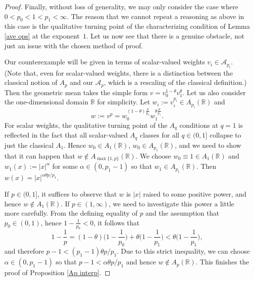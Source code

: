 \documentclass[11pt, reqno]{amsart}
\theoremstyle{definition}
\theoremstyle{remark}
\numberwithin{equation}{section}
\newcommand{\A}{\mathscr A}
\newcommand{\R}{\mathbb R}
\newcommand{\abs}[1]{|#1|}
\begin{document}
\begin{proof}
Finally, without loss of generality,
we may only consider the case where $0<p_0<1<p_1<\infty$.
The reason that we cannot repeat a reasoning as above in this case
is the qualitative turning point of the characterizing condition of
Lemma \ref{ave ops} at the exponent~$1$. Let us now see that
there is a genuine obstacle, not just an issue with the chosen method of proof.

Our counterexample will be given in terms of scalar-valued weights $v_i\in \A_{p_i}$.
(Note that, even for scalar-valued weights, there is a distinction between the classical notion of $A_p$ and our $\A_p$, which is a rescaling of the classical definition.) Then the geometric mean takes the simple form $v=v_0^{1-\theta}v_1^\theta$.
Let us also consider the one-dimensional domain $\R$ for simplicity. Let $w_i:=v_i^{p_i}\in A_{p_i}(\R)$ and
\begin{equation*}
w:=v^p=w_0^{(1-\theta)\frac{p}{p_0}}w_1^{\theta\frac{p}{p_1}}.
\end{equation*}
For scalar weights, the qualitative turning point of the $A_q$ conditions
at $q=1$ is reflected in the fact that all scalar-valued $A_q$ classes
for all $q\in(0,1]$ collapse to just the classical $A_1$.
Hence $w_0\in A_1(\R)$, $w_0\in A_{p_1}(\R)$,
and we need to show that it can happen that $w\notin A_{\max\{1,p\}}(\R)$.
We choose $w_0\equiv 1\in A_1(\R)$ and $w_1(x):=\abs{x}^\alpha$
for some $\alpha\in(0,p_1-1)$ so that $w_1\in A_{p_1}(\R)$.
Then $w(x)=\abs{x}^{\alpha\theta p/p_1}$.

If $p\in(0,1]$, it suffices to observe that $w$ is $\abs{x}$ raised to some positive power, and hence $w\notin A_1(\R)$.
If $p\in(1,\infty)$, we need to investigate this power a little more carefully. From the defining equality of $p$ and the assumption that $p_0\in(0,1)$, hence $1-\frac{1}{p_0}<0$, it follows that
\begin{equation*}
1-\frac1p
=(1-\theta)\bigg(1-\frac{1}{p_0}\bigg)+\theta\bigg(1-\frac{1}{p_1}\bigg)
<\theta\bigg(1-\frac{1}{p_1}\bigg),
\end{equation*}
and therefore $p-1<(p_1-1)\theta p/p_1$.
Due to this strict inequality, we can choose $\alpha\in(0,p_1-1)$
so that $p-1<\alpha\theta p/p_1$
and hence $w\notin A_p(\R)$.
This finishes the proof of Proposition \ref{Ap interp}.
\end{proof}
\end{document}
